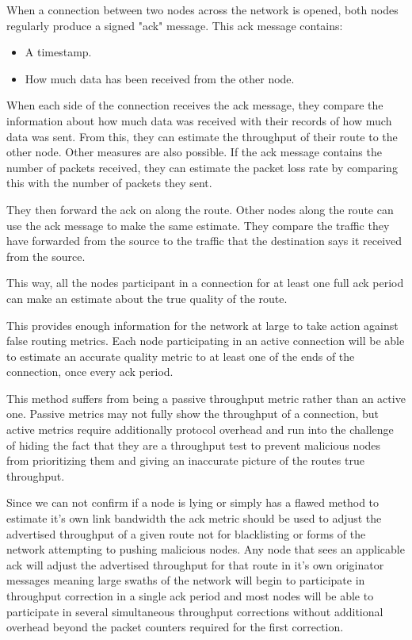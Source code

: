 \documentclass[11pt]{article}
\begin{document}
               When a connection between two nodes across the network is opened, both nodes regularly produce a signed "ack" message. This ack message contains:

              \begin{itemize}
                \item A timestamp.
                \item How much data has been received from the other node.
              \end{itemize}

				When each side of the connection receives the ack message, they compare the information about how much data was received with their records of how much data was sent. From this, they can estimate the throughput of their route to the other node. Other measures are also possible. If the ack message contains the number of packets received, they can estimate the packet loss rate by comparing this with the number of packets they sent.

				They then forward the ack on along the route. Other nodes along the route can use the ack message to make the same estimate. They compare the traffic they have forwarded from the source to the traffic that the destination says it received from the source.

				This way, all the nodes participant in a connection for at least one full ack period can make an estimate about the true quality of the route.

				This provides enough information for the network at large to take action against false routing metrics. Each node participating in an active connection will be able to estimate an accurate quality metric to at least one of the ends of the connection, once every ack period.

				This method suffers from being a passive throughput metric rather than an active one. Passive metrics may not fully show the throughput of a connection, but active metrics require additionally protocol overhead and run into the challenge of hiding the fact that they are a throughput test to prevent malicious nodes from prioritizing them and giving an inaccurate picture of the routes true throughput. 
				
				Since we can not confirm if a node is lying or simply has a flawed method to estimate it's own link bandwidth the ack metric should be used to adjust the advertised throughput of a given route not for blacklisting or forms of the network attempting to pushing malicious nodes. Any node that sees an applicable ack will adjust the advertised throughput for that route in it's own originator messages meaning large swaths of the network will begin to participate in throughput correction in a single ack period and most nodes will be able to participate in several simultaneous throughput corrections without additional overhead beyond the packet counters required for the first correction.
				
\end{document}
